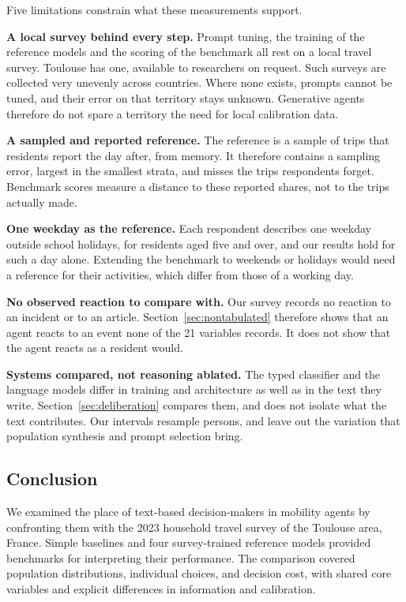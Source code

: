Five limitations constrain what these measurements support.

\textbf{A local survey behind every step.} Prompt tuning, the training of the reference models
and the scoring of the benchmark all rest on a local travel survey. Toulouse has one,
available to researchers on request. Such surveys are collected very unevenly across
countries. Where none exists, prompts cannot be tuned, and their error on that territory
stays unknown. Generative agents therefore do not spare a territory the need for local
calibration data.

\textbf{A sampled and reported reference.} The reference is a sample of trips that residents
report the day after, from memory. It therefore contains a sampling error, largest in the
smallest strata, and misses the trips respondents forget. Benchmark scores measure a distance
to these reported shares, not to the trips actually made.

\textbf{One weekday as the reference.} Each respondent describes one weekday outside school
holidays, for residents aged five and over, and our results hold for such a day alone.
Extending the benchmark to weekends or holidays would need a reference for their activities,
which differ from those of a working day.

\textbf{No observed reaction to compare with.} Our survey records no reaction to an incident
or to an article. Section~\ref{sec:nontabulated} therefore shows that an agent reacts to an
event none of the 21 variables records. It does not show that the agent reacts as a resident
would.

\textbf{Systems compared, not reasoning ablated.} The typed classifier and the language
models differ in training and architecture as well as in the text they write. Section~\ref{sec:deliberation}
compares them, and does not isolate what the text contributes. Our intervals resample
persons, and leave out the variation that population synthesis and prompt selection bring.

\subsection{Conclusion}
\label{sec:conclusion}

We examined the place of text-based decision-makers in mobility agents by confronting them with the 2023 household travel survey of the Toulouse area, France. Simple baselines and four survey-trained reference models provided benchmarks for interpreting their performance. The comparison covered population distributions, individual choices, and decision cost, with shared core variables and explicit differences in information and calibration.


